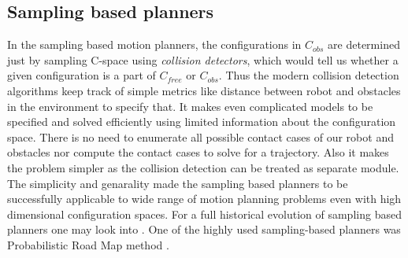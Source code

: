\documentclass[MTech]{iitmdiss}
\begin{document}
\subsection{Sampling based planners}
In the sampling based motion planners, the configurations in \emph{$C_{obs}$} are determined just by sampling C-space using \emph{collision detectors}, which would tell us whether a given configuration is a part of $C_{free}$ or $C_{obs}$. Thus the modern collision detection algorithms keep track of simple metrics like distance between robot and obstacles in the environment to specify that. It makes even complicated models to be specified and solved efficiently using limited information about the configuration space. There is no need to enumerate all possible contact cases of our robot and obstacles nor compute the contact cases to solve for a trajectory. Also it makes the problem simpler as the collision detection can be treated as separate module. The simplicity and genarality made the sampling based planners to be successfully applicable to wide range of motion planning problems even with high dimensional configuration spaces. For a full historical evolution of sampling based
 planners one may look into \cite{linde05}. One of the highly used sampling-based planners was Probabilistic Road Map method \cite{kavraki96}. 
 
\end{document}
